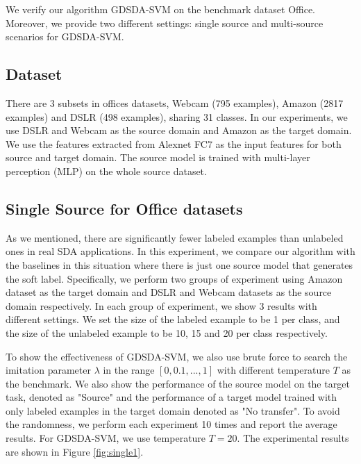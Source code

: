 We verify our algorithm GDSDA-SVM on the benchmark dataset Office. Moreover, we provide two different settings: single source and multi-source scenarios for GDSDA-SVM.
\subsection{Dataset}
There are 3 subsets in offices datasets, Webcam (795 examples), Amazon (2817 examples) and DSLR (498 examples), sharing 31 classes. In our experiments, we use DSLR and Webcam as the source domain and Amazon as the target domain.
We use the features extracted from Alexnet \cite{KrizhevskyNIPS12} FC7 as the input features for both source and target domain. The source model is trained with multi-layer perception (MLP) on the whole source dataset. 

\subsection{Single Source for Office datasets}
As we mentioned, there are significantly fewer labeled examples than unlabeled ones in real SDA applications. In this experiment, we compare our algorithm with the baselines in this situation where there is just one source model that generates the soft label. Specifically, we perform two groups of experiment using Amazon dataset as the target domain and DSLR and Webcam datasets as the source domain respectively. In each group of experiment, we show 3 results with different settings. We set the size of the labeled example to be 1 per class, and the size of the unlabeled example to be 10, 15 and 20 per class respectively.

To show the effectiveness of GDSDA-SVM, we also use brute force to search the imitation parameter $\lambda$ in the range $[0,0.1,...,1]$ with different temperature $T$ as the benchmark. We also show the performance of the source model on the target task, denoted as "Source" and the performance of a target model trained with only labeled examples in the target domain denoted as "No transfer". To avoid the randomness, we perform each experiment 10 times and report the average results. For GDSDA-SVM, we use temperature $T=20$. The experimental results are shown in Figure \ref{fig:single1}. 

